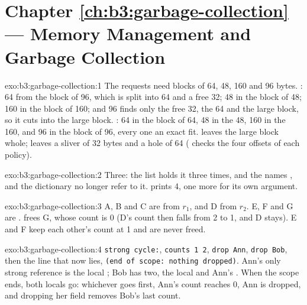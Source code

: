 \section*{Chapter \ref{ch:b3:garbage-collection} --- Memory Management and Garbage Collection}

\begin{solution}{exo:b3:garbage-collection:1}
The requests need blocks of 64, 48, 160 and 96 bytes. : 64 from the block of 96, which is split into 64 and a free 32; 48 in the block of 48; 160 in the block of 160; and 96 finds only the free 32, the 64 and the large block, so it cuts into the large block. : 64 in the block of 64, 48 in the 48, 160 in the 160, and 96 in the block of 96, every one an exact fit.  leaves the large block whole;  leaves a sliver of 32 bytes and a hole of 64 ( checks the four offsets of each policy).
\end{solution}

\begin{solution}{exo:b3:garbage-collection:2}
Three: the list  holds it three times, and the names ,  and the dictionary no longer refer to it.  prints 4, one more for its own argument.
\end{solution}

\begin{solution}{exo:b3:garbage-collection:3}
A, B and C are  from $r_1$, and D from $r_2$. E, F and G are .  frees G, whose count is 0 (D's count then falls from 2 to 1, and D stays). E and F keep each other's count at 1 and are never freed.
\end{solution}

\begin{solution}{exo:b3:garbage-collection:4}
\texttt{strong cycle:}, \texttt{counts 1 2}, \texttt{drop Ann}, \texttt{drop Bob}, then the line that now lies, \texttt{(end of scope: nothing dropped)}. Ann's only strong reference is the local ; Bob has two, the local and Ann's . When the scope ends, both locals go: whichever goes first, Ann's count reaches 0, Ann is dropped, and dropping her  field removes Bob's last count.
\end{solution}

